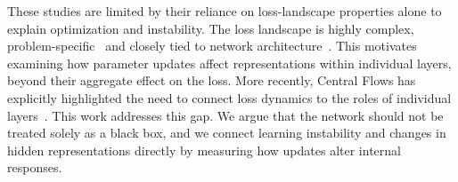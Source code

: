 These studies are limited by their reliance on loss-landscape properties alone to explain optimization and instability. The loss landscape is highly complex, problem-specific~\cite{ly2025multifractal,yang2021taxonomizing,ma2022multiscale} and closely tied to network architecture~\cite{li2018visualizing}. This motivates examining how parameter updates affect representations within individual layers, beyond their aggregate effect on the loss. More recently, Central Flows has explicitly highlighted the need to connect loss dynamics to the roles of individual layers~\cite{cohen2025central}. This work addresses this gap. We argue that the network should not be treated solely as a black box, and we connect learning instability and changes in hidden representations directly by measuring how updates alter internal responses.

